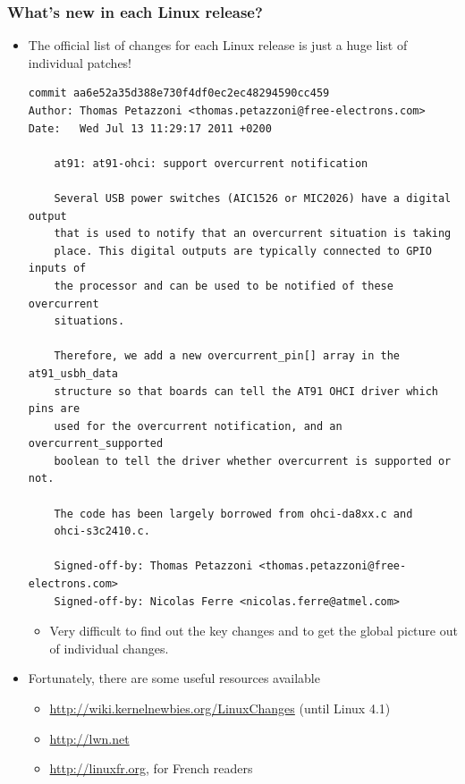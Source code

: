 \begin{frame}[fragile]
  \frametitle{What's new in each Linux release?}
  \begin{itemize}
  \item The official list of changes for each Linux release is just a
    huge list of individual patches!
\Tiny
    \begin{verbatim}
commit aa6e52a35d388e730f4df0ec2ec48294590cc459
Author: Thomas Petazzoni <thomas.petazzoni@free-electrons.com>
Date:   Wed Jul 13 11:29:17 2011 +0200

    at91: at91-ohci: support overcurrent notification

    Several USB power switches (AIC1526 or MIC2026) have a digital output
    that is used to notify that an overcurrent situation is taking
    place. This digital outputs are typically connected to GPIO inputs of
    the processor and can be used to be notified of these overcurrent
    situations.

    Therefore, we add a new overcurrent_pin[] array in the at91_usbh_data
    structure so that boards can tell the AT91 OHCI driver which pins are
    used for the overcurrent notification, and an overcurrent_supported
    boolean to tell the driver whether overcurrent is supported or not.

    The code has been largely borrowed from ohci-da8xx.c and
    ohci-s3c2410.c.

    Signed-off-by: Thomas Petazzoni <thomas.petazzoni@free-electrons.com>
    Signed-off-by: Nicolas Ferre <nicolas.ferre@atmel.com>
\end{verbatim}
\normalsize
    \begin{itemize}
    \item Very difficult to find out the key changes and to get the
      global picture out of individual changes.
    \end{itemize}
  \item Fortunately, there are some useful resources available
    \begin{itemize}
    \item \url{http://wiki.kernelnewbies.org/LinuxChanges}
	(until Linux 4.1)
    \item \url{http://lwn.net}
    \item \url{http://linuxfr.org}, for French readers
    \end{itemize}
  \end{itemize}
\end{frame}
